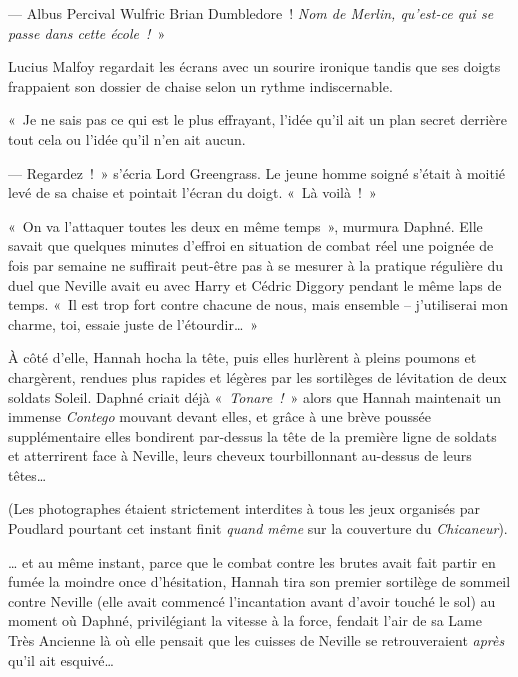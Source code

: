 --- Albus Percival Wulfric Brian Dumbledore~! \emph{Nom de Merlin, qu'est-ce qui se passe dans cette école~!}~»

Lucius Malfoy regardait les écrans avec un sourire ironique tandis que ses doigts frappaient son dossier de chaise selon un rythme indiscernable.

«~Je ne sais pas ce qui est le plus effrayant, l'idée qu'il ait un plan secret derrière tout cela ou l'idée qu'il n'en ait aucun.

--- Regardez~!~» s'écria Lord Greengrass. Le jeune homme soigné s'était à moitié levé de sa chaise et pointait l'écran du doigt. «~Là voilà~!~»

\later

«~On va l'attaquer toutes les deux en même temps~», murmura Daphné. Elle savait que quelques minutes d'effroi en situation de combat réel une poignée de fois par semaine ne suffirait peut-être pas à se mesurer à la pratique régulière du duel que Neville avait eu avec Harry et Cédric Diggory pendant le même laps de temps. «~Il est trop fort contre chacune de nous, mais ensemble -- j'utiliserai mon charme, toi, essaie juste de l'étourdir…~»

À côté d'elle, Hannah hocha la tête, puis elles hurlèrent à pleins poumons et chargèrent, rendues plus rapides et légères par les sortilèges de lévitation de deux soldats Soleil. Daphné criait déjà «~\emph{Tonare~!}~» alors que Hannah maintenait un immense \emph{Contego} mouvant devant elles, et grâce à une brève poussée supplémentaire elles bondirent par-dessus la tête de la première ligne de soldats et atterrirent face à Neville, leurs cheveux tourbillonnant au-dessus de leurs têtes…

(Les photographes étaient strictement interdites à tous les jeux organisés par Poudlard pourtant cet instant finit \emph{quand même} sur la couverture du \emph{Chicaneur}).

… et au même instant, parce que le combat contre les brutes avait fait partir en fumée la moindre once d'hésitation, Hannah tira son premier sortilège de sommeil contre Neville (elle avait commencé l'incantation avant d'avoir touché le sol) au moment où Daphné, privilégiant la vitesse à la force, fendait l'air de sa Lame Très Ancienne là où elle pensait que les cuisses de Neville se retrouveraient \emph{après} qu'il ait esquivé…

